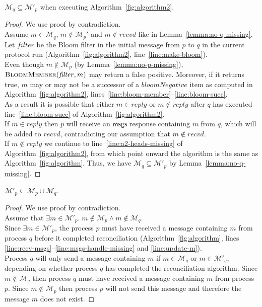 \documentclass[a4paper,anonymous,USenglish]{lipics-v2019}
\begin{document}
\begin{lemma}\label{lemma:no-q-missing2}
$\mathcal{M}_q \subseteq \mathcal{M}'_p$ when executing Algorithm~\ref{fig:algorithm2}.
\end{lemma}
\begin{proof}
We use proof by contradiction.\\
Assume $m \in \mathcal{M}_q$, $m \notin \mathcal{M}_p'$ and $m \notin \mathit{recvd}$ like in Lemma~\ref{lemma:no-q-missing}.\\
Let $\mathit{filter}$ be the Bloom filter in the initial message from $p$ to $q$ in the current protocol run (Algorithm~\ref{fig:algorithm2}, line~\ref{line:make-bloom}).\\
Even though $m \notin \mathcal{M}_p$ (by Lemma~\ref{lemma:no-p-missing}), $\textsc{BloomMember}(\mathit{filter}, m)$ may return a false positive.
Moreover, if it returns true, $m$ may or may not be a successor of a $\mathit{bloomNegative}$ item as computed in Algorithm~\ref{fig:algorithm2}, lines~\ref{line:bloom-member}--\ref{line:bloom-succ}.\\
As a result it is possible that either $m \in \mathit{reply}$ or $m \notin \mathit{reply}$ after $q$ has executed line~\ref{line:bloom-succ} of Algorithm~\ref{fig:algorithm2}.\\
If $m \in \mathit{reply}$ then $p$ will receive an $\mathsf{msgs}$ response containing $m$ from $q$, which will be added to $\mathit{recvd}$, contradicting our assumption that $m \notin \mathit{recvd}$.\\
If $m \notin \mathit{reply}$ we continue to line~\ref{line:a2-heads-missing} of Algorithm~\ref{fig:algorithm2}, from which point onward the algorithm is the same as Algorithm~\ref{fig:algorithm}.
Thus, we have $\mathcal{M}_q \subseteq \mathcal{M}'_p$ by Lemma~\ref{lemma:no-q-missing}.
\end{proof}

\begin{lemma}\label{lemma:no-extras}
$\mathcal{M}'_p \subseteq \mathcal{M}_p \cup \mathcal{M}_q$.
\end{lemma}
\begin{proof}
We use proof by contradiction.\\
Assume that $\exists m \in \mathcal{M}'_p.\; m \notin \mathcal{M}_p  \land  m \notin \mathcal{M}_q$.\\
Since $\exists m \in \mathcal{M}'_p$, the process $p$ must have received a message containing $m$ from process $q$ before it completed reconciliation (Algorithm~\ref{fig:algorithm}, lines \ref{line:recv-msgs}--\ref{line:msgs-handle-missing} and \ref{line:update-m}).\\
Process $q$ will only send a message containing $m$ if $m \in \mathcal{M}_q$ or $m \in \mathcal{M}'_q$, depending on whether process $q$ has completed the reconciliation algorithm.
Since $m \notin \mathcal{M}_q$ then process $q$ must have received a message containing $m$ from process $p$.
Since $m \notin \mathcal{M}_p$ then process $p$ will not send this message and therefore the message $m$ does not exist.
\end{proof}
\end{document}
